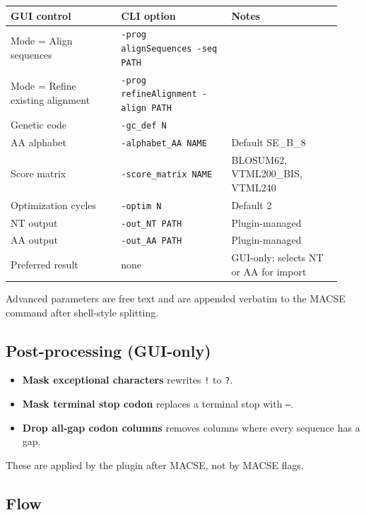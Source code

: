 \documentclass[11pt]{report}
\begin{document}
{\footnotesize
\begin{longtable}{@{}>{\raggedright\arraybackslash}p{0.31\linewidth}>{\raggedright\arraybackslash}p{0.31\linewidth}>{\raggedright\arraybackslash}p{0.31\linewidth}@{}}
\toprule
GUI control & CLI option & Notes \\
\midrule
\endhead
Mode = Align sequences & \texttt{-prog alignSequences -seq PATH} &  \\
Mode = Refine existing alignment & \texttt{-prog refineAlignment -align PATH} &  \\
Genetic code & \texttt{-gc\_\allowbreak def N} &  \\
AA alphabet & \texttt{-alphabet\_\allowbreak AA NAME} & Default SE\_B\_8 \\
Score matrix & \texttt{-score\_\allowbreak matrix NAME} & BLOSUM62, VTML200\_BIS, VTML240 \\
Optimization cycles & \texttt{-optim N} & Default 2 \\
NT output & \texttt{-out\_\allowbreak NT PATH} & Plugin-managed \\
AA output & \texttt{-out\_\allowbreak AA PATH} & Plugin-managed \\
Preferred result & none & GUI-only: selects NT or AA for import \\
\bottomrule
\end{longtable}
}

Advanced parameters are free text and are appended verbatim to the MACSE command after shell-style splitting.

\subsection{Post-processing (GUI-only)}

\begin{itemize}
  \item \textbf{Mask exceptional characters} rewrites \texttt{!} to \texttt{?}.
  \item \textbf{Mask terminal stop codon} replaces a terminal stop with \texttt{---}.
  \item \textbf{Drop all-gap codon columns} removes columns where every sequence has a gap.
\end{itemize}

These are applied by the plugin after MACSE, not by MACSE flags.

\subsection{Flow}
\end{document}
